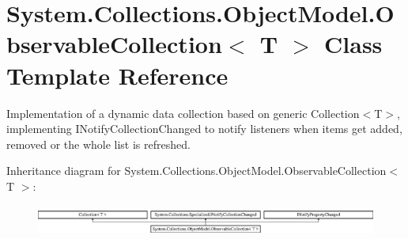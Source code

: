 \hypertarget{class_system_1_1_collections_1_1_object_model_1_1_observable_collection}{}\section{System.\+Collections.\+Object\+Model.\+Observable\+Collection$<$ T $>$ Class Template Reference}
\label{class_system_1_1_collections_1_1_object_model_1_1_observable_collection}


Implementation of a dynamic data collection based on generic Collection$<$T$>$, implementing I\+Notify\+Collection\+Changed to notify listeners when items get added, removed or the whole list is refreshed.  


Inheritance diagram for System.\+Collections.\+Object\+Model.\+Observable\+Collection$<$ T $>$\+:\begin{figure}[H]
\begin{center}
\leavevmode
\includegraphics[height=1.039926cm]{class_system_1_1_collections_1_1_object_model_1_1_observable_collection}
\end{center}
\end{figure}
